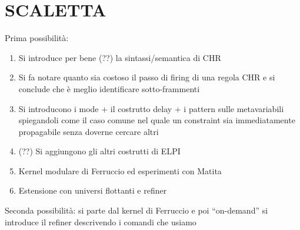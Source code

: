 \documentclass{easychair}
\begin{document}
\section{SCALETTA}

Prima possibilità:
\begin{enumerate}
\item Si introduce per bene (??) la sintassi/semantica di CHR
\item Si fa notare quanto sia costoso il passo di firing di una regola CHR
      e si conclude che è meglio identificare sotto-frammenti
\item Si introducono i mode + il costrutto delay + i pattern sulle metavariabili
      spiegandoli come il caso comune nel quale un constraint sia immediatamente
      propagabile senza doverne cercare altri
\item (??) Si aggiungono gli altri costrutti di ELPI
\item Kernel modulare di Ferruccio ed esperimenti con Matita
\item Estensione con universi flottanti e refiner
\end{enumerate}

Seconda possibilità: si parte dal kernel di Ferruccio e poi ``on-demand'' si introduce il refiner descrivendo i comandi che usiamo 

\label{sect:bib}


\end{document}
